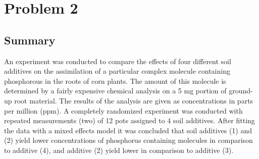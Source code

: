 \documentclass[11pt,a4paper]{article}
\begin{document}
\newpage
\section*{Problem 2}
\subsection*{Summary}
An experiment was conducted to compare the effects of four different soil additives on the assimilation of a particular complex molecule containing phosphorous in the roots of corn plants. The 
amount of this molecule is determined by a fairly expensive chemical analysis on a 5 mg portion of ground-up root material. The results of the analysis are given as concentrations in parts per
million (ppm). A completely randomized experiment was conducted with repeated measurements (two) of 12 pots assigned to 4 soil additives. After fitting the data with a mixed effects model it was concluded that soil additives (1) and (2) yield lower concentrations of phosphorus containing molecules in comparison to additive (4), and additive (2) yield lower in comparison to additive (3). 
\end{document}
